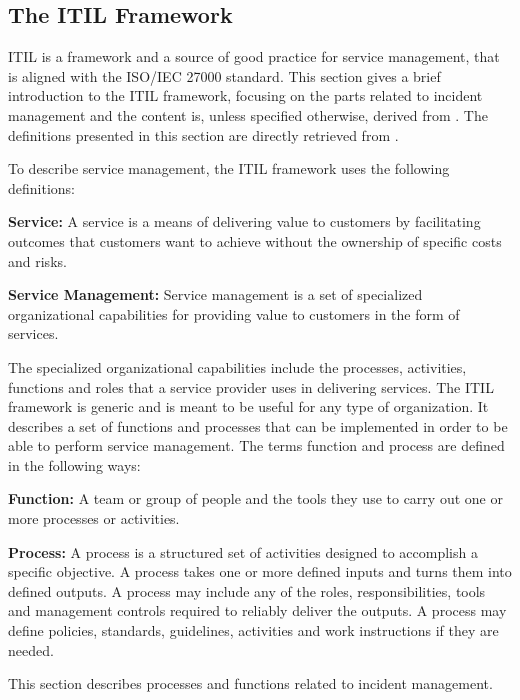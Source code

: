 \subsection{The ITIL Framework}
\label{section:ITIL}
\ac{ITIL} is a framework and a source of good practice for service management, that is aligned with the \acs{ISO}/\acs{IEC} 27000 standard. This section gives a brief introduction to the \ac{ITIL} framework, focusing on the parts related to incident management and the content is, unless specified otherwise, derived from \cite{itilbok}. The definitions presented in this section are directly retrieved from \cite{itilbok}.

To describe service management, the \ac{ITIL} framework uses the following definitions:

\textbf{Service:} A service is a means of delivering value to customers by facilitating outcomes that customers want to achieve without the ownership of specific costs and risks.

\textbf{Service Management:} Service management is a set of specialized organizational capabilities for providing value to customers in the form of services.

The specialized organizational capabilities include the processes, activities, functions and roles that a service provider uses in delivering services. The \ac{ITIL} framework is generic and is meant to be useful for any type of organization. It describes a set of functions and processes that can be implemented in order to be able to perform service management. The terms function and process are defined in the following ways:

\textbf{Function:} A team or group of people and the tools they use to carry out one or more processes or activities.

\textbf{Process:} A process is a structured set of activities designed to accomplish a specific objective. A process takes one or more defined inputs and turns them into defined outputs. A process may include any of the roles, responsibilities, tools and management controls required to reliably deliver the outputs. A process may define policies, standards, guidelines, activities and work instructions if they are needed.


This section describes processes and functions related to incident management.

